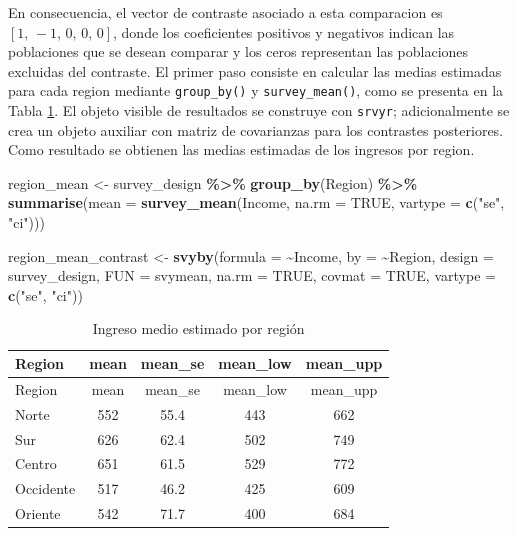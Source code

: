 \documentclass[
  spanish,
  12pt,
]{book}
\newenvironment{Shaded}{\begin{snugshade}}{\end{snugshade}}
\newcommand{\AttributeTok}[1]{\textcolor[rgb]{0.13,0.29,0.53}{#1}}
\newcommand{\ConstantTok}[1]{\textcolor[rgb]{0.56,0.35,0.01}{#1}}
\newcommand{\FunctionTok}[1]{\textcolor[rgb]{0.13,0.29,0.53}{\textbf{#1}}}
\newcommand{\NormalTok}[1]{#1}
\newcommand{\OtherTok}[1]{\textcolor[rgb]{0.56,0.35,0.01}{#1}}
\newcommand{\SpecialCharTok}[1]{\textcolor[rgb]{0.81,0.36,0.00}{\textbf{#1}}}
\newcommand{\StringTok}[1]{\textcolor[rgb]{0.31,0.60,0.02}{#1}}
\begin{document}
En consecuencia, el vector de contraste asociado a esta comparacion es \(\left[1,\,-1,\,0,\,0,\,0\right]\), donde los coeficientes positivos y negativos indican las poblaciones que se desean comparar y los ceros representan las poblaciones excluidas del contraste. El primer paso consiste en calcular las medias estimadas para cada region mediante \texttt{group\_by()} y \texttt{survey\_mean()}, como se presenta en la Tabla \ref{tab:tab-prom-region}. El objeto visible de resultados se construye con \texttt{srvyr}; adicionalmente se crea un objeto auxiliar con matriz de covarianzas para los contrastes posteriores. Como resultado se obtienen las medias estimadas de los ingresos por region.

\begin{Shaded}
\begin{Highlighting}[]
\NormalTok{region\_mean }\OtherTok{\textless{}{-}}\NormalTok{ survey\_design }\SpecialCharTok{\%\textgreater{}\%}
  \FunctionTok{group\_by}\NormalTok{(Region) }\SpecialCharTok{\%\textgreater{}\%}
  \FunctionTok{summarise}\NormalTok{(}\AttributeTok{mean =} \FunctionTok{survey\_mean}\NormalTok{(Income,}
                               \AttributeTok{na.rm =} \ConstantTok{TRUE}\NormalTok{,}
                               \AttributeTok{vartype =} \FunctionTok{c}\NormalTok{(}\StringTok{"se"}\NormalTok{, }\StringTok{"ci"}\NormalTok{)))}

\NormalTok{region\_mean\_contrast }\OtherTok{\textless{}{-}} \FunctionTok{svyby}\NormalTok{(}\AttributeTok{formula =} \SpecialCharTok{\textasciitilde{}}\NormalTok{Income,}
                              \AttributeTok{by =} \SpecialCharTok{\textasciitilde{}}\NormalTok{Region,}
                              \AttributeTok{design =}\NormalTok{ survey\_design,}
                              \AttributeTok{FUN =}\NormalTok{ svymean,}
                              \AttributeTok{na.rm =} \ConstantTok{TRUE}\NormalTok{,}
                              \AttributeTok{covmat =} \ConstantTok{TRUE}\NormalTok{,}
                              \AttributeTok{vartype =} \FunctionTok{c}\NormalTok{(}\StringTok{"se"}\NormalTok{, }\StringTok{"ci"}\NormalTok{))}
\end{Highlighting}
\end{Shaded}

\begin{longtable}[]{@{}lcccc@{}}
\caption{\label{tab:tab-prom-region}Ingreso medio estimado por región}\tabularnewline
\toprule\noalign{}
Region & mean & mean\_se & mean\_low & mean\_upp \\
\midrule\noalign{}
\endfirsthead
\toprule\noalign{}
Region & mean & mean\_se & mean\_low & mean\_upp \\
\midrule\noalign{}
\endhead
\bottomrule\noalign{}
\endlastfoot
Norte & 552 & 55.4 & 443 & 662 \\
Sur & 626 & 62.4 & 502 & 749 \\
Centro & 651 & 61.5 & 529 & 772 \\
Occidente & 517 & 46.2 & 425 & 609 \\
Oriente & 542 & 71.7 & 400 & 684 \\
\end{longtable}
\end{document}
